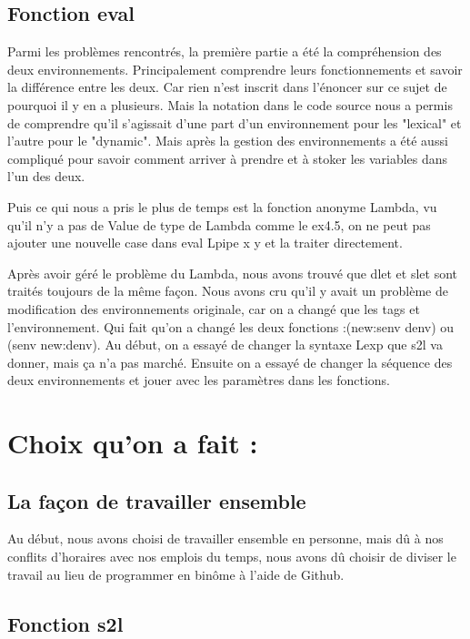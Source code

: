 \documentclass{article}
\begin{document}
\subsection{Fonction eval}


Parmi les problèmes rencontrés, la première partie a été la compréhension des deux environnements. Principalement comprendre leurs fonctionnements et savoir la différence entre les deux. Car rien n'est inscrit dans l'énoncer sur ce sujet de pourquoi il y en a plusieurs. Mais la notation dans le code source nous a permis de comprendre qu'il s'agissait d'une part d'un environnement pour les "lexical" et l'autre pour le "dynamic". Mais après la gestion des environnements a été aussi compliqué pour savoir comment arriver à prendre et à stoker les variables dans l'un des deux.

Puis ce qui nous a pris le plus de temps est la fonction anonyme Lambda, vu qu’il n'y a pas de Value de type de Lambda comme le ex4.5, on ne peut pas ajouter une nouvelle case dans eval Lpipe x y et la traiter directement.

Après avoir géré le problème du Lambda, nous avons trouvé que dlet et slet sont traités toujours de la même façon. Nous avons cru qu'il y avait un problème de modification des environnements originale, car on a changé que les tags et l'environnement. Qui fait qu'on a changé les deux fonctions :(new:senv denv) ou (senv new:denv). Au début, on a essayé de changer la syntaxe Lexp que s2l va donner, mais ça n’a pas marché. Ensuite on a essayé de changer la séquence des deux environnements et jouer avec les paramètres dans les fonctions.

\newpage

\section{Choix qu'on a fait :}
\vspace{0.5cm}

\subsection{La façon de travailler ensemble}


Au début, nous avons choisi de travailler ensemble en personne, mais dû à nos conflits d'horaires avec nos emplois du temps, nous avons dû choisir de diviser le travail au lieu de programmer en binôme à l'aide de Github.
\subsection{Fonction s2l}
\end{document}
